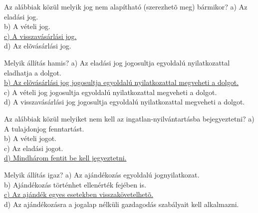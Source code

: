 \begin{frame}


\begin{tcolorbox}[title={168. Kérdés}]
Az alábbiak közül melyik jog nem alapítható (szerezhetõ meg) bármikor?
\tcblower
a) Az eladási jog.\\
b) A vételi jog.\\
\uline {c) A visszavásárlási jog.}\\
d) Az elõvásárlási jog.
\end{tcolorbox}

\begin{tcolorbox}[title={169. Kérdés}]
Melyik állítás hamis?
\tcblower
a) Az eladási jog jogosultja egyoldalú nyilatkozattal eladhatja a dolgot.\\
\uline {b) Az elõvásárlási jog jogosultja egyoldalú nyilatkozattal megveheti a dolgot.}\\
c) A vételi jog jogosultja egyoldalú nyilatkozattal megveheti a dolgot.\\
d) A visszavásárlási jog jogosultja egyoldalú nyilatkozattal megveheti a dolgot.
\end{tcolorbox}

\begin{tcolorbox}[title={170. Kérdés}]
Az alábbiak közül melyiket nem kell az ingatlan-nyilvántartásba bejegyeztetni?
\tcblower
a) A tulajdonjog fenntartást.\\
b) A vételi jogot.\\
c) Az eladási jogot.\\
\uline {d) Mindhárom fentit be kell jegyeztetni.}
\end{tcolorbox}

\begin{tcolorbox}[title={171. Kérdés}]
Melyik állítás igaz?
\tcblower
a) Az ajándékozás egyoldalú jognyilatkozat.\\
b) Ajándékozás történhet ellenérték fejében is.\\
\uline {c) Az ajándék egyes esetekben visszakövetelhetõ.}\\
d) Az ajándékozásra a jogalap nélküli gazdagodás szabályait kell alkalmazni.
\end{tcolorbox}

\end{frame}


